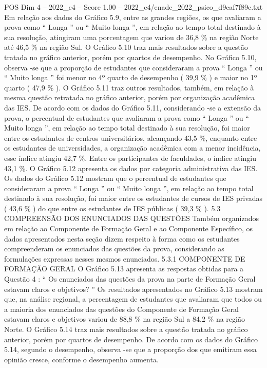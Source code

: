 \begin{textsample}{POS Dim 4 – 2022\_c4 – Score 1.00 – 2022\_c4/enade\_2022\_psico\_d9caf7f89c.txt}
Em relação aos dados do Gráfico 5.9, entre as grandes regiões, os que avaliaram a prova como “ Longa ” ou “ Muito longa ”, em relação ao tempo total destinado à sua resolução, atingiram uma porcentagem que variou de 36,8 \% na região Norte até 46,5 \% na região Sul.
O Gráfico 5.10 traz mais resultados sobre a questão tratada no gráfico anterior, porém por quartos de desempenho.
No Gráfico 5.10, observa -se que a proporção de estudantes que consideraram a prova “ Longa ” ou “ Muito longa ” foi menor no 4º quarto de desempenho ( 39,9 \% ) e maior no 1º quarto ( 47,9 \% ).
O Gráfico 5.11 traz outros resultados, também, em relação à mesma questão retratada no gráfico anterior, porém por organização acadêmica das IES.
De acordo com os dados do Gráfico 5.11, considerando -se a extensão da prova, o percentual de estudantes que avaliaram a prova como “ Longa ” ou “ Muito longa ”, em relação ao tempo total destinado à sua resolução, foi maior entre os estudantes de centros universitários, alcançando 43,5 \%, enquanto entre os estudantes de universidades, a organização acadêmica com a menor incidência, esse índice atingiu 42,7 \%.
Entre os participantes de faculdades, o índice atingiu 43,1 \%.
O Gráfico 5.12 apresenta os dados por categoria administrativa das IES.
Os dados do Gráfico 5.12 mostram que o percentual de estudantes que consideraram a prova “ Longa ” ou “ Muito longa ”, em relação ao tempo total destinado à sua resolução, foi maior entre os estudantes de cursos de IES privadas ( 43,6 \% ) do que entre os estudantes de IES públicas ( 39,3 \% ). 5.3 COMPREENSÃO DOS ENUNCIADOS DAS QUESTÕES Também organizados em relação ao Componente de Formação Geral e ao Componente Específico, os dados apresentados nesta seção dizem respeito à forma como os estudantes compreenderam os enunciados das questões da prova, considerando as formulações expressas nesses mesmos enunciados. 5.3.1 COMPONENTE DE FORMAÇÃO GERAL O Gráfico 5.13 apresenta as respostas obtidas para a Questão 4 : “ Os enunciados das questões da prova na parte de Formação Geral estavam claros e objetivos? ” Os resultados apresentados no Gráfico 5.13 mostram que, na análise regional, a percentagem de estudantes que avaliaram que todos ou a maioria dos enunciados das questões do Componente de Formação Geral estavam claros e objetivos variou de 88,8 \% na região Sul a 84,2 \% na região Norte.
O Gráfico 5.14 traz mais resultados sobre a questão tratada no gráfico anterior, porém por quartos de desempenho.
De acordo com os dados do Gráfico 5.14, segundo o desempenho, observa -se que a proporção dos que emitiram essa opinião cresce, conforme o desempenho aumenta.

\end{textsample}
